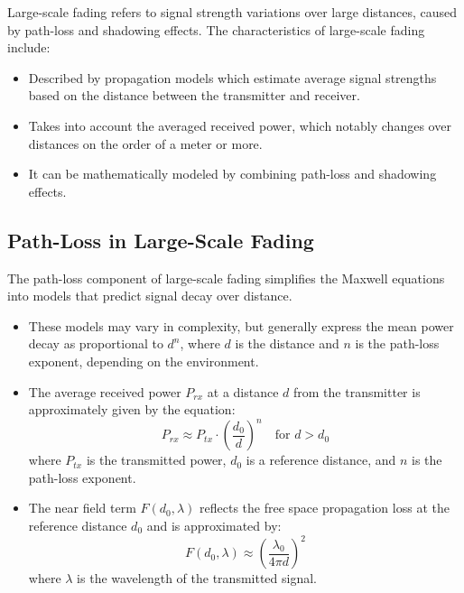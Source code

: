 Large-scale fading refers to signal strength variations over large distances, caused by path-loss and shadowing effects. The characteristics of large-scale fading include:

\begin{itemize}
    \item Described by propagation models which estimate average signal strengths based on the distance between the transmitter and receiver.
    \item Takes into account the averaged received power, which notably changes over distances on the order of a meter or more.
    \item It can be mathematically modeled by combining path-loss and shadowing effects.
\end{itemize}

\subsection*{Path-Loss in Large-Scale Fading}

The path-loss component of large-scale fading simplifies the Maxwell equations into models that predict signal decay over distance.

\begin{itemize}
    \item These models may vary in complexity, but generally express the mean power decay as proportional to \(d^n\), where \(d\) is the distance and \(n\) is the path-loss exponent, depending on the environment.
    \item The average received power \(P_{rx}\) at a distance \(d\) from the transmitter is approximately given by the equation:
    \[
    P_{rx} \approx P_{tx} \cdot \left( \frac{d_0}{d} \right)^n \quad \text{for } d > d_0
    \]
    where \(P_{tx}\) is the transmitted power, \(d_0\) is a reference distance, and \(n\) is the path-loss exponent.
    \item The near field term \(F(d_0, \lambda)\) reflects the free space propagation loss at the reference distance \(d_0\) and is approximated by:
    \[
    F(d_0, \lambda) \approx \left( \frac{\lambda_0}{4 \pi d} \right)^2
    \]
    where \(\lambda\) is the wavelength of the transmitted signal.
\end{itemize}

